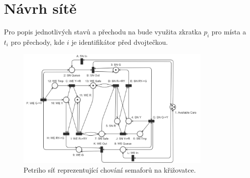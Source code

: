 \section*{Návrh sítě}
\label{sec:network_design}

Pro popis jednotlivých stavů a přechodu na  bude využita zkratka $p_i$ pro místa a $t_i$ pro přechody, kde $i$ je identifikátor před dvojtečkou.

\begin{figure}[h!]
    \centering
    \includegraphics[width=0.85\textwidth]{assets/pes_network}
    \caption{Petriho síť reprezentující chování semaforů na křižovatce.}
    \label{fig:network}
\end{figure}

